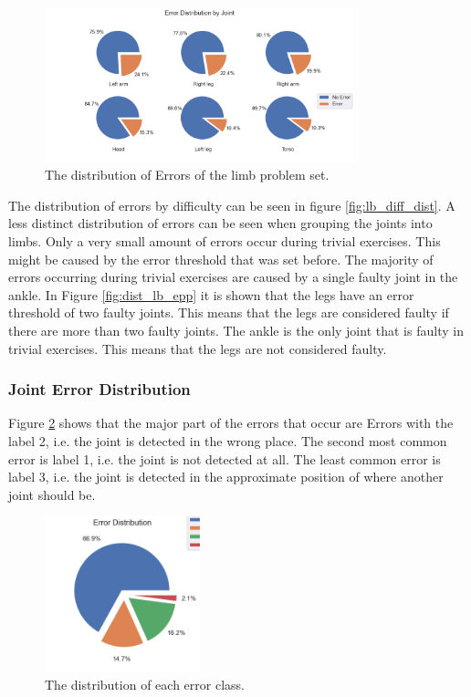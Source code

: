 \begin{figure}
  \centering
  \includegraphics[width=0.8\textwidth]{figures/Data/dist_limbs/Error_Distribution_by_Joint.png}
  \caption[Error Distribution by Limb]{The distribution of Errors of the limb problem set.}
  \label{fig:lb_pie}
\end{figure}

The distribution of errors by difficulty can be seen in figure \ref{fig:lb_diff_dist}. A less distinct distribution of errors can be seen when grouping the joints into limbs. Only a very small amount of errors occur during trivial exercises. This might be caused by the error threshold that was set before. The majority of errors occurring during trivial exercises are caused by a single faulty joint in the ankle. In Figure \ref{fig:dist_lb_epp} it is shown that the legs have an error threshold of two faulty joints. This means that the legs are considered faulty if there are more than two faulty joints. The ankle is the only joint that is faulty in trivial exercises. This means that the legs are not considered faulty.

\subsubsection{Joint Error Distribution}

Figure \ref{fig:jt_pie} shows that the major part of the errors that occur are Errors with the label 2, i.e. the joint is detected in the wrong place. The second most common error is label 1, i.e. the joint is not detected at all. The least common error is label 3, i.e. the joint is detected in the approximate position of where another joint should be.

\begin{figure}
  \centering
  \includegraphics[width=0.4\textwidth]{figures/Data/dist_joints/Error_Distribution.png}
  \caption[Error Distribution for each error class]{The distribution of each error class.}
  \label{fig:jt_pie}
\end{figure}

